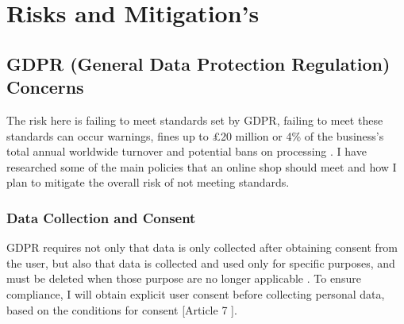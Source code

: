 \documentclass[]{project_report}
\begin{document}
\begin{center}
\end{center}



\chapter{Risks and Mitigation's}

\section{GDPR (General Data Protection Regulation) Concerns}

The risk here is failing to meet standards set by GDPR, failing to meet these standards can occur warnings, fines up to £20 million or 4\% of the business’s total annual worldwide turnover and potential bans on processing \cite{europeancommission_2023}. I have researched some of the main policies that an online shop should meet and how I plan to mitigate the overall risk of not meeting standards.

\subsection{Data Collection and Consent}
GDPR requires not only that data is only collected after obtaining consent from the user, but also that data is collected and used only for specific purposes, and must be deleted when those purpose are no longer applicable \cite{basin_2018}. To ensure compliance, I will obtain explicit user consent before collecting personal data, based on the conditions for consent \cite{gdpr_2016}[Article 7 ].
\end{document}
